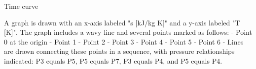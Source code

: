 Time curve

A graph is drawn with an x-axis labeled "s [kJ/kg K]" and a y-axis labeled "T [K]". The graph includes a wavy line and several points marked as follows:
- Point 0 at the origin
- Point 1
- Point 2
- Point 3
- Point 4
- Point 5
- Point 6
- Lines are drawn connecting these points in a sequence, with pressure relationships indicated: P3 equals P5, P5 equals P7, P3 equals P4, and P5 equals P4.